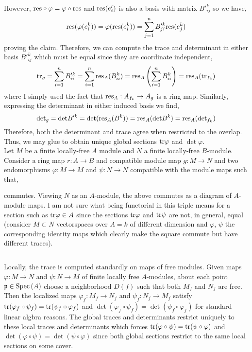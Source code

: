 \documentclass[12pt]{article}
\begin{document}
However, $\mathrm{res} \circ \varphi = \varphi \circ \mathrm{res}$ and $\mathrm{res}(e'_i)$ is also a basis with matrix $B'^k_{ij}$ so we have,
\[ \mathrm{res}(\varphi(e^k_i)) = \varphi(\mathrm{res}(e^k_i)) = \sum_{j = 1}^n B'^k_{ji} \mathrm{res}(e^k_j) \]
proving the claim. Therefore, we can compute the trace and determinant in either basis $B'^k_{ij}$ which must be equal since they are coordinate independent,
\[ \mathrm{tr}_g = \sum_{i = 1}^n B'^k_{ii} = \sum_{i = 1}^n \mathrm{res}_A(B^k_{ii}) = \mathrm{res}_A\left( \sum_{i = 1}^n B^k_{ii} \right) = \mathrm{res}_A(\mathrm{tr}_{f_k}) \]
where I simply used the fact that $\mathrm{res}_A : A_{f_k} \to A_g$ is a ring map. Similarly, expressing the determinant in either induced basis we find,
\[ \mathrm{det}_g = \mathrm{det}{B'^k} = \mathrm{det}{(\mathrm{res}_A(B^k))} = \mathrm{res}_A{(\mathrm{det}{B^k})} = \mathrm{res}_A(\mathrm{det}_{f_k}) \]
Therefore, both the determinant and trace agree when restricted to the overlap. Thus, we may glue to obtain unique global sections $\mathrm{tr}{\varphi}$ and $\det{\varphi}$. 
\bigskip\\
Let $M$ be a finite locally-free $A$ module and $N$ a finite locally-free $B$-module. Consider a ring map $r : A \to B$ and compatible module map $g : M \to N$ and two endomorphisms $\varphi : M \to M$ and $\psi : N \to N$ compatible with the module maps such that,
\begin{center}
\end{center} 
commutes. Viewing $N$ as an $A$-module, the above commutes as a diagram of $A$-module maps. I am not sure what being functorial in this triple means for a section such as $\mathrm{tr}{\varphi} \in A$ since the sections $\mathrm{tr}{\varphi}$ and $\mathrm{tr}{\psi}$ are not, in general, equal (consider $M \subset N$ vectorspaces over $A = k$ of different dimension and $\varphi$, $\psi$ the corresponding identity maps which clearly make the square commute but have different traces). 

\subsection{}

Locally, the trace is computed standardly on maps of free modules. Given maps $\varphi : M \to N$ and $\psi : N \to M$ of finite locally free $A$-modules, about each point $\mathfrak{p} \in \mathrm{Spec}\left( A \right)$ choose a neighborhood $D(f)$ such that both $M_f$ and $N_f$ are free. Then the localized maps $\varphi_f : M_f \to N_f$ and $\psi_f : N_f \to M_f$ satisfy $\mathrm{tr}{(\varphi_f \circ \psi_f)} = \mathrm{tr}{(\psi_f \circ \varphi_f)}$ and $\det{(\varphi_f \circ \psi_f)} = \det{(\psi_f \circ \varphi_f)}$ for standard linear algbra reasons. The global traces and determinants restrict uniquely to these local traces and determinants which forces $\mathrm{tr}{(\varphi \circ \psi)} = \mathrm{tr}{(\psi \circ \varphi)}$ and $\det{(\varphi \circ \psi)} = \det{(\psi \circ \varphi)}$ since both global sections restrict to the same local sections on some cover. 
\end{document}
